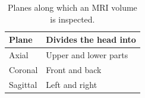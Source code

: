 \begin{table}[t]
  \centering
  \caption{Planes along which an MRI volume is inspected.}
  \label{tab:mri_planes}
  \small
  \begin{tabular}{@{}p{}p{}@{}}
    \toprule
    Plane & Divides the head into \\
    \midrule
    Axial    & Upper and lower parts \\
    Coronal  & Front and back \\
    Sagittal & Left and right \\
    \bottomrule
  \end{tabular}
\end{table}
